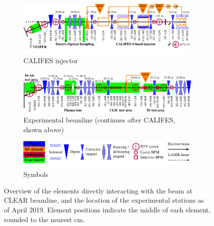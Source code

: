 \documentclass[a4paper,
               keeplastbox,   %
               ]{jacow}
\begin{document}
\begin{figure}[t]
  \centering
  \begin{subfigure}{\textwidth}
    \centering
    \includegraphics{MOPTS054f1.pdf}
    \vspace{-2.5em} %
    \caption{CALIFES injector}
  \end{subfigure}
  \begin{subfigure}{\textwidth}
    \centering
    \vspace{-1em}
    \includegraphics{MOPTS054f2.pdf}
    \vspace{-0.5em}
    \caption{Experimental beamline
      (continues after CALIFES, shown above)}
  \end{subfigure}
  \begin{subfigure}{\textwidth}
    \centering
    \vspace{-0.5em}
    \includegraphics{MOPTS054f3.pdf}
    \vspace{-2em} %
    \caption{Symbols}
  \end{subfigure}
  \caption{Overview of the elements directly interacting with the beam at CLEAR beamline, and the location of the experimental stations as of April 2019. Element positions indicate the middle of each element, rounded to the nearest cm.}
  \label{fig:layout}
\end{figure}
\end{document}

